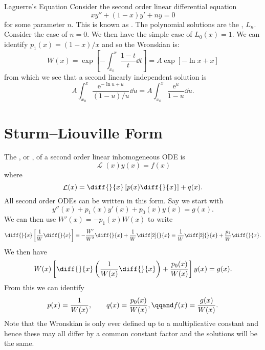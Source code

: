 \documentclass[fleqn]{NotesClass}
\newcommand*{\e}{\mathrm{e}}
\DeclareMathOperator{\linop}{\mathcal{L}}
\begin{document}
    \begin{exm}{Laguerre's Equation}{}
        Consider the second order linear differential equation
        \begin{equation}
            xy'' + (1 - x)y' + ny = 0
        \end{equation}
        for some parameter \(n\).
        This is known as .
        The polynomial solutions are the , \(L_n\).
        Consider the case of \(n = 0\).
        We then have the simple case of \(L_0(x) = 1\).
        We can identify \(p_1(x) = (1 - x)/x\) and so the Wronskian is:
        \begin{equation}
            W(x) = \exp\left[ -\int_{x_0}^{x} \frac{1 - t}{t} \dd{t} \right] = A\exp[-\ln x + x]
        \end{equation}
        from which we see that a second linearly independent solution is
        \begin{equation}
            A\int_{x_0}^{x} \frac{\e^{-\ln u + u}}{(1 - u)/u}\dd{u} = A\int_{x_0}^{x} \frac{\e^{u}}{1 - u} \dd{u}.
        \end{equation}
    \end{exm}
    
    \section{Sturm--Liouville Form}
    The , or , of a second order linear inhomogeneous  ODE is
    \begin{equation}
        \linop(x)y(x) = f(x)
    \end{equation}
    where
    \begin{equation}
        \linop(x) = \diff{}{x}\left[ p(x) \diff{}{x} \right] + q(x).
    \end{equation}
    All second order ODEs can be written in this form.
    Say we start with
    \begin{equation}
        y''(x) + p_1(x)y'(x) + p_0(x)y(x) = g(x).
    \end{equation}
    We can then use \(W'(x) = -p_1(x)W(x)\) to write
    \begin{equation}
        \diff{}{x}\left[ \frac{1}{W}\diff{}{x} \right] = -\frac{W'}{W^2}\diff{}{x} + \frac{1}{W}\diff[2]{}{x} = \frac{1}{W}\diff[2]{}{x} + \frac{p_1}{W}\diff{}{x}.
    \end{equation}
    We then have
    \begin{equation}
        W(x)\left[ \diff{}{x}\left( \frac{1}{W(x)}\diff{}{x} \right) + \frac{p_0(x)}{W(x)} \right]y(x) = g(x).
    \end{equation}
    From this we can identify
    \begin{equation}
        p(x) = \frac{1}{W(x)}, \qquad q(x) = \frac{p_0(x)}{W(x)}, \qqand f(x) = \frac{g(x)}{W(x)}.
    \end{equation}
    Note that the Wronskian is only ever defined up to a multiplicative constant and hence these may all differ by a common constant factor and the solutions will be the same.
    
\end{document}

